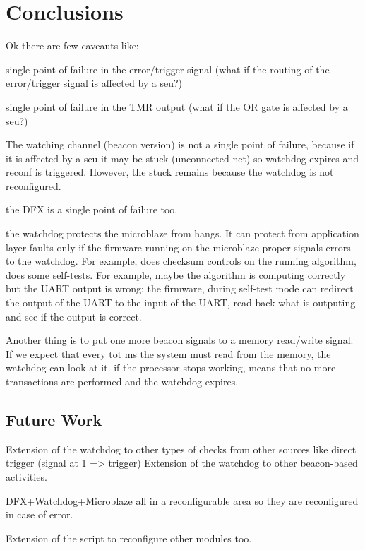 \chapter{Conclusions}

Ok there are few caveauts like: 

single point of failure in the error/trigger signal (what if the routing of the error/trigger signal is affected by a seu?)

single point of failure in the TMR output (what if the OR gate is affected by a seu?)

The watching channel (beacon version) is not a single point of failure, because if it is affected by a seu it may be stuck (unconnected net) so watchdog expires and reconf is triggered. However, the stuck remains because the watchdog is not reconfigured.

the DFX is a single point of failure too.


the watchdog protects the microblaze from hangs. It can protect from application layer faults only if the firmware running on the microblaze proper signals errors to the watchdog. For example, does checksum controls on the running algorithm, does some self-tests. For example, maybe the algorithm is computing correctly but the UART output is wrong: the firmware, during self-test mode can redirect the output of the UART to the input of the UART, read back what is outputing and see if the output is correct. 

Another thing is to put one more beacon signals to a memory read/write signal. If we expect that every tot ms the system must read from the memory, the watchdog can look at it. if the processor stops working, means that no more transactions are performed and the watchdog expires.


\section{Future Work}

Extension of the watchdog to other types of checks from other sources like direct trigger (signal at 1 => trigger)
Extension of the watchdog to other beacon-based activities.

DFX+Watchdog+Microblaze all in a reconfigurable area so they are reconfigured in case of error.

Extension of the script to reconfigure other modules too.